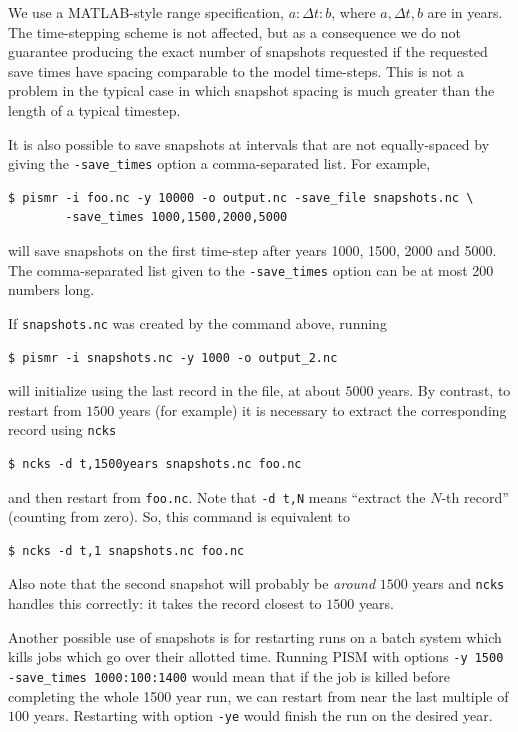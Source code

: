 \documentclass[11pt,final]{amsart}
\newcommand{\pismoptionindex}[1]{\index{options for PISM (and PETSc)!\texttt{-#1}}}
\newcommand{\intextoption}[1]{\texttt{-#1}\pismoptionindex{#1}}
\begin{document}
We use a MATLAB-style range specification, $a:\Delta t:b$, where $a,\Delta t,b$ are in years.  The time-stepping scheme is not affected, but as a consequence we do not guarantee producing the exact number of snapshots requested if the requested save times have spacing comparable to the model time-steps.  This is not a problem in the typical case in which snapshot spacing is much greater than the length of a typical timestep.

It is also possible to save snapshots at intervals that are not equally-spaced
by giving the \verb|-save_times| option a comma-separated list. For example,
\begin{verbatim}
$ pismr -i foo.nc -y 10000 -o output.nc -save_file snapshots.nc \
        -save_times 1000,1500,2000,5000
\end{verbatim}
will save snapshots on the first time-step after years 1000, 1500, 2000 and 5000.
The comma-separated list given to the \verb|-save_times| option can be at most 200 numbers long.

If \verb|snapshots.nc| was created by the command above, running
\begin{verbatim}
$ pismr -i snapshots.nc -y 1000 -o output_2.nc
\end{verbatim}
will initialize using the last record in the file, at about $5000$ years.  By contrast, to restart from $1500$ years (for example) it is necessary to extract the corresponding record using \verb|ncks|
\begin{verbatim}
$ ncks -d t,1500years snapshots.nc foo.nc
\end{verbatim}
and then restart from \verb|foo.nc|.  Note that \verb|-d t,N| means ``extract the $N$-th record'' (counting from zero).  So, this command is equivalent to
\begin{verbatim}
$ ncks -d t,1 snapshots.nc foo.nc
\end{verbatim}
Also note that the second snapshot will probably be \emph{around} $1500$ years and \verb|ncks| handles this correctly: it takes the record closest to $1500$ years.

Another possible use of snapshots is for restarting runs on a batch system which kills jobs which go over their allotted time.  Running PISM with options \verb|-y 1500| \verb|-save_times 1000:100:1400| would mean that if the job is killed before completing the whole 1500 year run, we can restart from near the last multiple of $100$ years.  Restarting with option \intextoption{ye} would finish the run on the desired year.
\end{document}
